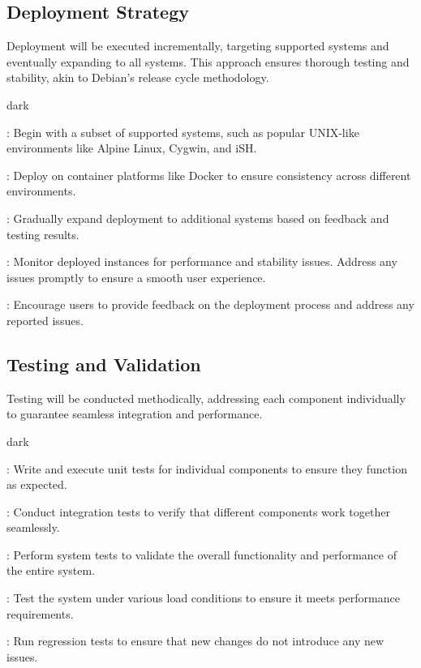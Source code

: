 \subsection{Deployment Strategy}
\label{sec:start:sub:deployment}
Deployment will be executed incrementally, targeting supported systems and eventually expanding to all systems.
This approach ensures thorough testing and stability, akin to Debian's release cycle methodology.
\bigskip
\begin{baseBoxOne}{}{dark}
    \begin{posnexItemize}
        \item[\sA] : Begin with a subset of supported systems, such as popular UNIX-like environments like Alpine Linux, Cygwin, and iSH.
        \item[\sA] : Deploy on container platforms like Docker to ensure consistency across different environments.
        \item[\sA] : Gradually expand deployment to additional systems based on feedback and testing results.
        \item[\sA] : Monitor deployed instances for performance and stability issues. Address any issues promptly to ensure a smooth user experience.
        \item[\sA] : Encourage users to provide feedback on the deployment process and address any reported issues.
    \end{posnexItemize}
\end{baseBoxOne}

\subsection{Testing and Validation}
\label{sec:start:sub:valid}
Testing will be conducted methodically, addressing each component individually to guarantee seamless integration and performance.
\bigskip
\begin{baseBoxOne}{}{dark}
    \begin{posnexItemize}
        \item[\sA] : Write and execute unit tests for individual components to ensure they function as expected.
        \item[\sA] : Conduct integration tests to verify that different components work together seamlessly.
        \item[\sA] : Perform system tests to validate the overall functionality and performance of the entire system.
        \item[\sA] : Test the system under various load conditions to ensure it meets performance requirements.
        \item[\sA] : Run regression tests to ensure that new changes do not introduce any new issues.
    \end{posnexItemize}
\end{baseBoxOne}


